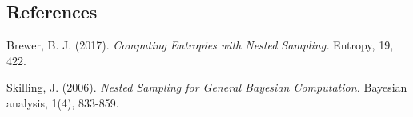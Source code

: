 \documentclass[12pt]{article}
\begin{document}
%        
%
%        

\subsection*{References}

\begin{description}

\item Brewer, B. J. (2017).
\textit{Computing Entropies with Nested Sampling.}
Entropy, 19, 422.

\item Skilling, J. (2006).
\textit{Nested Sampling for General Bayesian Computation.}
Bayesian analysis, 1(4), 833-859.

\end{description}
\end{document}
